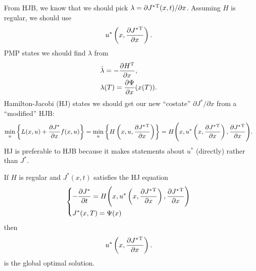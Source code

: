 From HJB, we know that we should pick $\lambda=\partial J^*{}^\text{T}(x,t)/\partial x$. Assuming $H$ is regular, we should use
\begin{gather}
  u^*\left(x,\frac{\partial J^*{}^\text{T}}{\partial x}\right).
\end{gather}
PMP states we should find $\lambda$ from
\begin{align}
  & \dot \lambda = -\frac{\partial H^\text{T}}{\partial x}, \\
  & \lambda(T) = \frac{\partial \Psi}{\partial x}(x(T)).
\end{align}
Hamilton-Jacobi (HJ) states we should get our new ``costate'' $\partial J^*/\partial x$ from a ``modified'' HJB:
\begin{gather}
  \min_u \left\{ L(x,u) + \frac{\partial J^*}{\partial x} f(x,u) \right\} = \min_u \left\{ H\left(x,u,\frac{\partial J^*{}^\text{T}}{\partial x}\right) \right\} = H\Bigg( x, u^*\left(x,\frac{\partial J^*{}^\text{T}}{\partial x}\right), \frac{\partial J^*{}^\text{T}}{\partial x} \Bigg).
\end{gather}
HJ is preferable to HJB because it makes statements about $u^*$ (directly) rather than $J^*$.

\begin{thm}
  If $H$ is regular and $J^*(x,t)$ satisfies the HJ equation
  \begin{gather}
    \begin{dcases}
      -\frac{\partial J^*}{\partial t} = H\Bigg( x, u^*\left(x,\frac{\partial J^*{}^\text{T}}{\partial x}\right), \frac{\partial J^*{}^\text{T}}{\partial x} \Bigg) \\
      J^*(x,T) = \Psi(x)
    \end{dcases}
  \end{gather}
  then
  \begin{gather}
    u^*\left(x,\frac{\partial J^*{}^\text{T}}{\partial x}\right).
  \end{gather}
  is the global optimal solution.
\end{thm}

